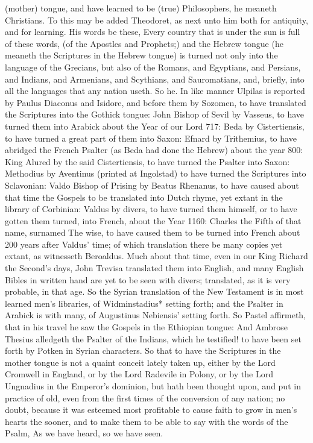 (mother) tongue, and have learned to be (true) Philosophers, he meaneth Christians. To this may be added Theodoret, as next unto him both for antiquity, and for learning. His words be these, Every country that is under the sun is full of these words, (of the Apostles and Prophets;) and the Hebrew tongue (he meaneth the Scriptures in the Hebrew tongue) is turned not only into the language of the Grecians, but also of the Romans, and Egyptians, and Persians, and Indians, and Armenians, and Scythians, and Sauromatians, and, briefly, into all the languages that any nation useth. So he. In like manner Ulpilas is reported by Paulus Diaconus and Isidore, and before them by Sozomen, to have translated the Scriptures into the Gothick tongue: John Bishop of Sevil by Vasseus, to have turned them into Arabick about the Year of our Lord 717: Beda by Cistertiensis, to have turned a great part of them into Saxon: Efnard by Trithemius, to have abridged the French Psalter (as Beda had done the Hebrew) about the year 800: King Alured by the said Cistertiensis, to have turned the Psalter into Saxon: Methodius by Aventinus (printed at Ingolstad) to have turned the Scriptures into Sclavonian: Valdo Bishop of Prising by Beatus Rhenanus, to have caused about that time the Gospels to be translated into Dutch rhyme, yet extant in the library of Corbinian: Valdus by divers, to have turned them himself, or to have gotten them turned, into French, about the Year 1160: Charles the Fifth of that name, surnamed The wise, to have caused them to be turned into French about 200 years after Valdus' time; of which translation there be many copies yet extant, as witnesseth Beroaldus. Much about that time, even in our King Richard the Second's days, John Trevisa translated them into English, and many English Bibles in written hand are yet to be seen with divers; translated, as it is very probable, in that age. So the Syrian translation of the New Testament is in most learned men's libraries, of Widminstadius* setting forth; and the Psalter in Arabick is with many, of Augustinus Nebiensis' setting forth. So Pastel affirmeth, that in his travel he saw the Gospels in the Ethiopian tongue: And Ambrose Thesius alledgeth the Psalter of the Indians, which he testified! to have been set forth by Potken in Syrian characters. So that to have the Scriptures in the mother tongue is not a quaint conceit lately taken up, either by the Lord Cromwell in England, or by the Lord Radevile in Polony, or by the Lord Ungnadius in the Emperor's dominion, but hath been thought upon, and put in practice of old, even from the first times of the conversion of any nation; no doubt, because it was esteemed most profitable to cause faith to grow in men's hearts the sooner, and to make them to be able to say with the words of the Psalm, As we have heard, so we have seen.

